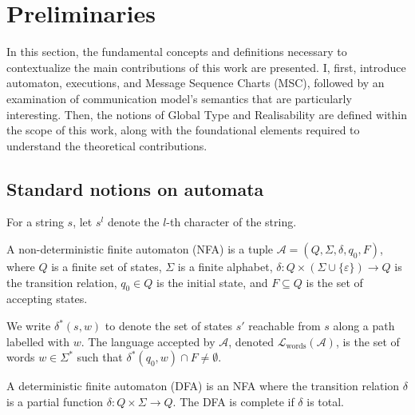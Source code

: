 \chapter{Preliminaries}\label{sec:pre}
In this section, the fundamental concepts and definitions necessary 
to contextualize the main contributions of this work are presented. 
I, first, introduce automaton, executions, and
Message Sequence Charts (MSC), followed by 
an examination of communication model's semantics that are particularly 
interesting. 
Then, the notions of Global Type and Realisability are 
defined within the scope of this work, along with the foundational 
elements required to understand the theoretical contributions.

\section{Standard notions on automata}
For a string $s$, let $s^l$ denote the $l$-th character of the string.

\bigskip

\begin{definition}[NFA]\label{def:nfa}
A non-deterministic finite automaton (NFA) is a tuple  
$\mathcal{A} = (Q, \Sigma, \delta, q_0, F)$, where $Q$ is a finite set of  
states, $\Sigma$ is a finite alphabet,  
$\delta : Q \times (\Sigma \cup \{\varepsilon\}) \to Q$ is the transition  
relation, $q_0 \in Q$ is the initial state, and $F \subseteq Q$ is the set  
of accepting states.  

We write $\delta^*(s,w)$ to denote the set of states $s'$ reachable from  
$s$ along a path labelled with $w$. The language accepted by $\mathcal{A}$,  
denoted $\mathcal{L}_{\text{words}}(\mathcal{A})$, is the set of words  
$w \in \Sigma^*$ such that $\delta^*(q_0,w) \cap F \neq \emptyset$.  
\end{definition}

\bigskip

\begin{definition}[DFA]\label{def:dfa}
A deterministic finite automaton (DFA) is an NFA where the transition  
relation $\delta$ is a partial function  
$\delta : Q \times \Sigma \to Q$. The DFA is complete if $\delta$ is  
total.  

\end{definition}

